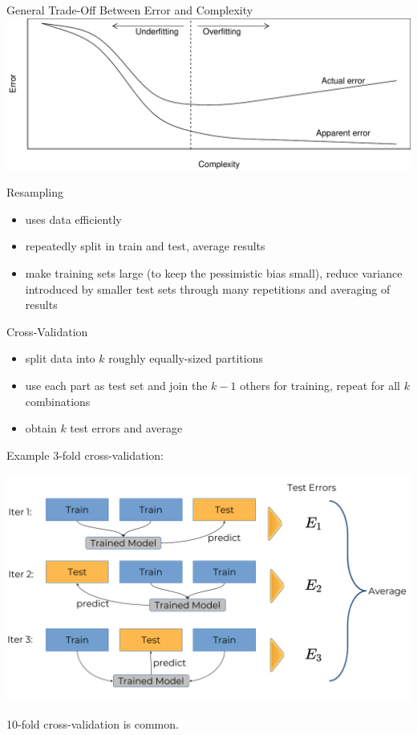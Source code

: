     \begin{frame}[c]{General Trade-Off Between Error and Complexity}
    \includegraphics[width=\textwidth]{images/overfitting2}
    \end{frame}

    \begin{frame}[c]{Resampling}
        \begin{itemize}
            \item uses data efficiently
            \item repeatedly split in train and test, average results
            \item make training sets large (to keep the pessimistic bias small),
                reduce variance introduced by smaller test sets through many
                repetitions and averaging of results
        \end{itemize}
    \end{frame}

    \begin{frame}[c]{Cross-Validation}

    \begin{itemize}
      \item split data into $k$ roughly equally-sized partitions
      \item use each part as test set and join the $k-1$ others for training,
          repeat for all $k$ combinations
      \item obtain $k$ test errors and average
    \end{itemize}

    Example 3-fold cross-validation:

    \begin{center}
    \includegraphics[height=.5\textheight]{images/crossvalidation}
    \end{center}
    10-fold cross-validation is common.
    \end{frame}

